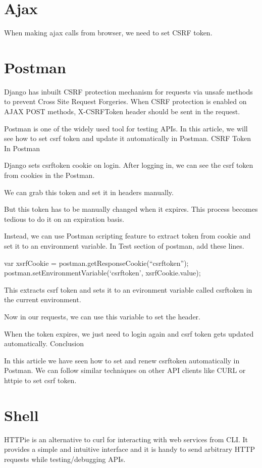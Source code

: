 \documentclass[letterpaper,11pt,english]{sphinxmanual}
\begin{document}
\section{Ajax}
\label{\detokenize{misc_csrf_token:ajax}}
When making ajax calls from browser, we need to set CSRF token.


\section{Postman}
\label{\detokenize{misc_csrf_token:postman}}
Django has inbuilt CSRF protection mechanism for requests via unsafe methods to prevent Cross Site Request Forgeries. When CSRF protection is enabled on AJAX POST methods, X-CSRFToken header should be sent in the request.

Postman is one of the widely used tool for testing APIs. In this article, we will see how to set csrf token and update it automatically in Postman.
CSRF Token In Postman

Django sets csrftoken cookie on login. After logging in, we can see the csrf token from cookies in the Postman.

We can grab this token and set it in headers manually.

But this token has to be manually changed when it expires. This process becomes tedious to do it on an expiration basis.

Instead, we can use Postman scripting feature to extract token from cookie and set it to an environment variable. In Test section of postman, add these lines.

var xsrfCookie = postman.getResponseCookie(“csrftoken”);
postman.setEnvironmentVariable(‘csrftoken’, xsrfCookie.value);

This extracts csrf token and sets it to an evironment variable called csrftoken in the current environment.

Now in our requests, we can use this variable to set the header.

When the token expires, we just need to login again and csrf token gets updated automatically.
Conclusion

In this article we have seen how to set and renew csrftoken automatically in Postman. We can follow similar techniques on other API clients like CURL or httpie to set csrf token.


\section{Shell}
\label{\detokenize{misc_csrf_token:shell}}
HTTPie is an alternative to curl for interacting with web services from CLI. It provides a simple and intuitive interface and it is handy to send arbitrary HTTP requests while testing/debugging APIs.
\end{document}
